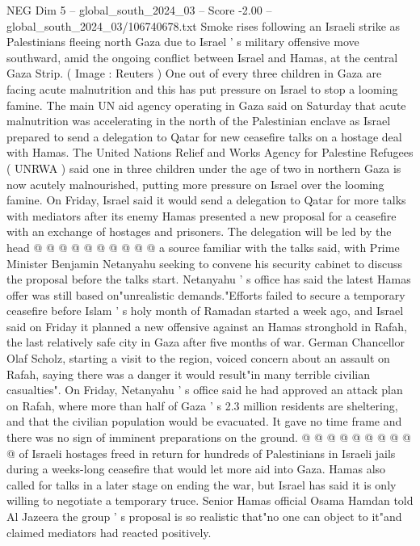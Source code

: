 \begin{textsample}{NEG Dim 5 – global\_south\_2024\_03 – Score -2.00 – global\_south\_2024\_03/106740678.txt}  \label{ex:f5_neg_201}
Smoke rises following an Israeli strike as Palestinians fleeing north Gaza due to Israel ' s military offensive move southward, amid the ongoing conflict between Israel and Hamas, at the central Gaza Strip. ( Image : Reuters ) One out of every three children in Gaza are facing acute malnutrition and this has put pressure on Israel to stop a looming famine.
The main UN aid agency operating in Gaza said on Saturday that acute malnutrition was accelerating in the north of the Palestinian enclave as Israel prepared to send a delegation to Qatar for new ceasefire talks on a hostage deal with Hamas.
The United Nations Relief and Works Agency for Palestine Refugees ( UNRWA ) said one in three children under the age of two in northern Gaza is now acutely malnourished, putting more pressure on Israel over the looming famine.
On Friday, Israel said it would send a delegation to Qatar for more talks with mediators after its enemy Hamas presented a new proposal for a ceasefire with an exchange of hostages and prisoners.
The delegation will be led by the head @ @ @ @ @ @ @ @ @ @ a source familiar with the talks said, with Prime Minister Benjamin Netanyahu seeking to convene his security cabinet to discuss the proposal before the talks start.
Netanyahu ' s office has said the latest Hamas offer was still based on"unrealistic demands."Efforts failed to secure a temporary ceasefire before Islam ' s holy month of Ramadan started a week ago, and Israel said on Friday it planned a new offensive against an Hamas stronghold in Rafah, the last relatively safe city in Gaza after five months of war.
German Chancellor Olaf Scholz, starting a visit to the region, voiced concern about an assault on Rafah, saying there was a danger it would result"in many terrible civilian casualties".
On Friday, Netanyahu ' s office said he had approved an attack plan on Rafah, where more than half of Gaza ' s 2.3 million residents are sheltering, and that the civilian population would be evacuated.
It gave no time frame and there was no sign of imminent preparations on the ground. @ @ @ @ @ @ @ @ @ @ of Israeli hostages freed in return for hundreds of Palestinians in Israeli jails during a weeks-long ceasefire that would let more aid into Gaza.
Hamas also called for talks in a later stage on ending the war, but Israel has said it is only willing to negotiate a temporary truce.
Senior Hamas official Osama Hamdan told Al Jazeera the group ' s proposal is so realistic that"no one can object to it"and claimed mediators had reacted positively.

\end{textsample}
